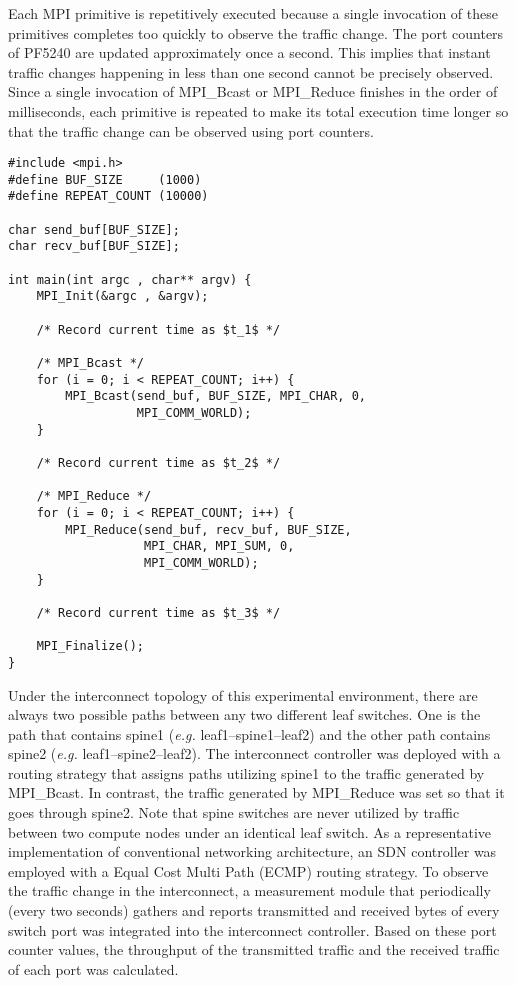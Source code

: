 Each MPI primitive is repetitively executed because a single invocation
of these primitives completes too quickly to observe the traffic change.
The port counters of PF5240 are updated approximately once a second.
This implies that instant traffic changes happening in less than one
second cannot be precisely observed. Since a single invocation of
MPI\_Bcast or MPI\_Reduce finishes in the order of milliseconds,
each primitive is repeated to make its total execution time longer so that
the traffic change can be observed using port counters.

\begin{lstlisting}[caption={Source code of MPI application}, label=lst:sync-mpi-app, float=htbp]
#include <mpi.h>
#define BUF_SIZE     (1000)
#define REPEAT_COUNT (10000)

char send_buf[BUF_SIZE];
char recv_buf[BUF_SIZE];

int main(int argc , char** argv) {
    MPI_Init(&argc , &argv);

    /* Record current time as $t_1$ */

    /* MPI_Bcast */
    for (i = 0; i < REPEAT_COUNT; i++) {
        MPI_Bcast(send_buf, BUF_SIZE, MPI_CHAR, 0,
                  MPI_COMM_WORLD);
    }

    /* Record current time as $t_2$ */

    /* MPI_Reduce */
    for (i = 0; i < REPEAT_COUNT; i++) {
        MPI_Reduce(send_buf, recv_buf, BUF_SIZE,
                   MPI_CHAR, MPI_SUM, 0,
                   MPI_COMM_WORLD);
    }

    /* Record current time as $t_3$ */

    MPI_Finalize();
}
\end{lstlisting}

Under the interconnect topology of this experimental environment, there
are always two possible paths between any two different leaf switches.
One is the path that contains spine1 (\emph{e.g.} leaf1--spine1--leaf2) and
the other path contains spine2 (\emph{e.g.} leaf1--spine2--leaf2). The
interconnect controller was deployed with a routing strategy that assigns
paths utilizing spine1 to the traffic generated by MPI\_Bcast. In contrast,
the traffic generated by MPI\_Reduce was set so that it goes through spine2.
Note that spine switches are never utilized by traffic between two compute
nodes under an identical leaf switch. As a representative implementation of
conventional networking architecture, an SDN controller was employed with a
Equal Cost Multi Path (ECMP) routing strategy. To observe the traffic change
in the interconnect, a measurement module that periodically (every two
seconds) gathers and reports transmitted and received bytes of every switch
port was integrated into the interconnect controller. Based on these port
counter values, the throughput of the transmitted traffic and the received
traffic of each port was calculated.

